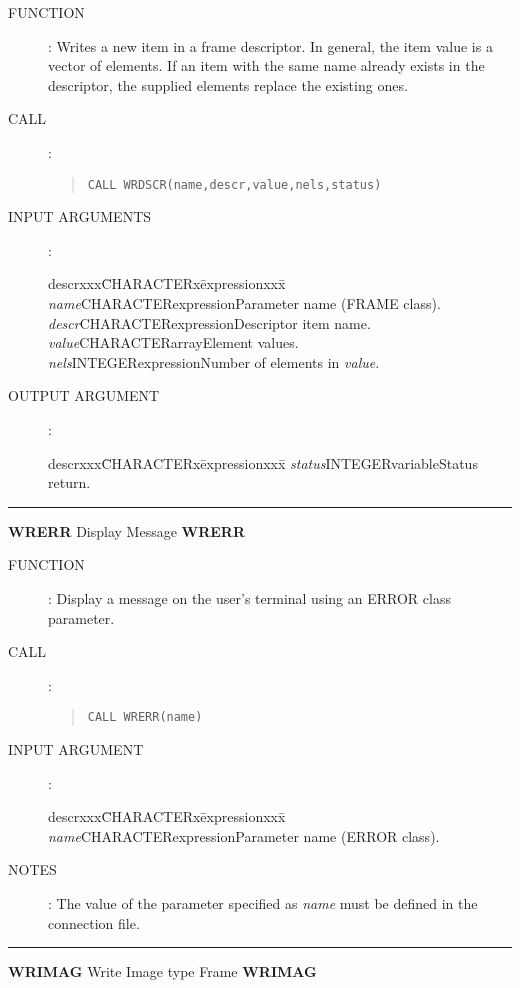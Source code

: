 \documentclass{article}
\begin{document}
\begin{description}
\item [FUNCTION]:
Writes a new item in a frame descriptor.
In general, the item value is a vector of elements.
If an item with the same name already exists in the descriptor, the supplied
elements replace the existing ones.
\item [CALL]:
\begin{quote}
{\tt CALL WRDSCR(name,descr,value,nels,status)}
\end{quote}
\item [INPUT ARGUMENTS]:
\begin{tabbing}
descrxxx\=CHARACTERx\=expressionxxx\=\kill
{\em name}\>CHARACTER\>expression\>Parameter name (FRAME class).\\
{\em descr}\>CHARACTER\>expression\>Descriptor item name.\\
{\em value}\>CHARACTER\>array\>Element values.\\
{\em nels}\>INTEGER\>expression\>Number of elements in {\em value}.
\end{tabbing}
\item [OUTPUT ARGUMENT]:
\begin{tabbing}
descrxxx\=CHARACTERx\=expressionxxx\=\kill
{\em status}\>INTEGER\>variable\>Status return.
\end{tabbing}
\end{description}
\rule{\textwidth}{0.3mm}
{\Large {\bf WRERR} \hfill Display Message \hfill {\bf WRERR}}
\begin{description}
\item [FUNCTION]:
Display a message on the user's terminal using an ERROR class parameter.
\item [CALL]:
\begin{quote}
{\tt CALL WRERR(name)}
\end{quote}
\item [INPUT ARGUMENT]:
\begin{tabbing}
descrxxx\=CHARACTERx\=expressionxxx\=\kill
{\em name}\>CHARACTER\>expression\>Parameter name (ERROR class).
\end{tabbing}
\item [NOTES]:
The value of the parameter specified as {\em name} must be defined in the connection
file.
\end{description}
\rule{\textwidth}{0.3mm}
{\Large {\bf WRIMAG} \hfill Write Image type Frame \hfill {\bf WRIMAG}}
\end{document}
